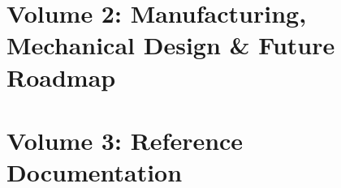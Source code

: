 \documentclass[10pt,twocolumn,a4paper]{article}
\begin{document}














\clearpage
\part{Volume 2: Manufacturing, Mechanical Design \& Future Roadmap}



\clearpage
\part{Volume 3: Reference Documentation}




\end{document}
